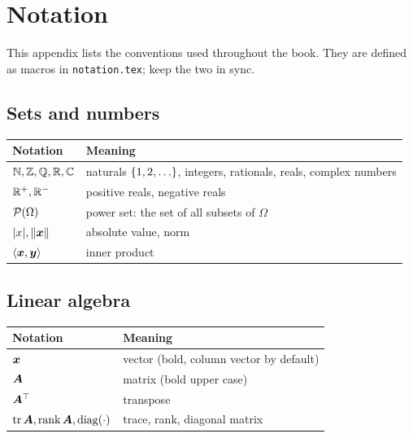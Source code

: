 \chapter{Notation}\label{app:notation}

This appendix lists the conventions used throughout the book. They are defined as macros in \texttt{notation.tex}; keep the two in sync.

\section*{Sets and numbers}
\begin{tabular}{@{}lp{}@{}}
\toprule
Notation & Meaning \\
\midrule
$\mathbb{N}, \mathbb{Z}, \mathbb{Q}, \mathbb{R}, \mathbb{C}$ & naturals $\left\{ 1, 2, \ldots \right\}$, integers, rationals, reals, complex numbers \\
$\mathbb{R}^{+}, \mathbb{R}^{-}$ & positive reals, negative reals \\
$\mathcal{P}(\Omega)$ & power set: the set of all subsets of $\Omega$ \\
$\lvert x\rvert, \lVert\bm{x}\rVert$ & absolute value, norm \\
$\langle\bm{x}, \bm{y}\rangle$ & inner product \\
\bottomrule
\end{tabular}

\section*{Linear algebra}
\begin{tabular}{@{}lp{}@{}}
\toprule
Notation & Meaning \\
\midrule
$\bm{x}$ & vector (bold, column vector by default) \\
$\bm{A}$ & matrix (bold upper case) \\
$\bm{A}^{\top}$ & transpose \\
$\operatorname{tr} \bm{A}, \operatorname{rank} \bm{A}, \operatorname{diag}(\cdot)$ & trace, rank, diagonal matrix \\
\bottomrule
\end{tabular}

